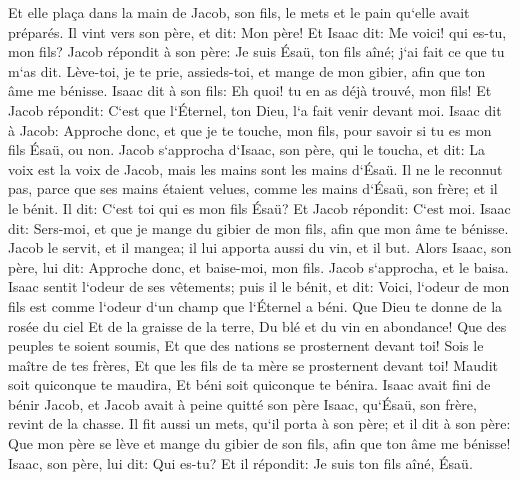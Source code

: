 \verse Et elle plaça dans la main de Jacob, son fils, le mets et le pain qu`elle avait préparés. 
\verse Il vint vers son père, et dit: Mon père! Et Isaac dit: Me voici! qui es-tu, mon fils? 
\verse Jacob répondit à son père: Je suis Ésaü, ton fils aîné; j`ai fait ce que tu m`as dit. Lève-toi, je te prie, assieds-toi, et mange de mon gibier, afin que ton âme me bénisse. 
\verse Isaac dit à son fils: Eh quoi! tu en as déjà trouvé, mon fils! Et Jacob répondit: C`est que l`Éternel, ton Dieu, l`a fait venir devant moi. 
\verse Isaac dit à Jacob: Approche donc, et que je te touche, mon fils, pour savoir si tu es mon fils Ésaü, ou non. 
\verse Jacob s`approcha d`Isaac, son père, qui le toucha, et dit: La voix est la voix de Jacob, mais les mains sont les mains d`Ésaü. 
\verse Il ne le reconnut pas, parce que ses mains étaient velues, comme les mains d`Ésaü, son frère; et il le bénit. 
\verse Il dit: C`est toi qui es mon fils Ésaü? Et Jacob répondit: C`est moi. 
\verse Isaac dit: Sers-moi, et que je mange du gibier de mon fils, afin que mon âme te bénisse. Jacob le servit, et il mangea; il lui apporta aussi du vin, et il but. 
\verse Alors Isaac, son père, lui dit: Approche donc, et baise-moi, mon fils. 
\verse Jacob s`approcha, et le baisa. Isaac sentit l`odeur de ses vêtements; puis il le bénit, et dit: Voici, l`odeur de mon fils est comme l`odeur d`un champ que l`Éternel a béni. 
\verse Que Dieu te donne de la rosée du ciel Et de la graisse de la terre, Du blé et du vin en abondance! 
\verse Que des peuples te soient soumis, Et que des nations se prosternent devant toi! Sois le maître de tes frères, Et que les fils de ta mère se prosternent devant toi! Maudit soit quiconque te maudira, Et béni soit quiconque te bénira. 
\verse Isaac avait fini de bénir Jacob, et Jacob avait à peine quitté son père Isaac, qu`Ésaü, son frère, revint de la chasse. 
\verse Il fit aussi un mets, qu`il porta à son père; et il dit à son père: Que mon père se lève et mange du gibier de son fils, afin que ton âme me bénisse! 
\verse Isaac, son père, lui dit: Qui es-tu? Et il répondit: Je suis ton fils aîné, Ésaü. 
